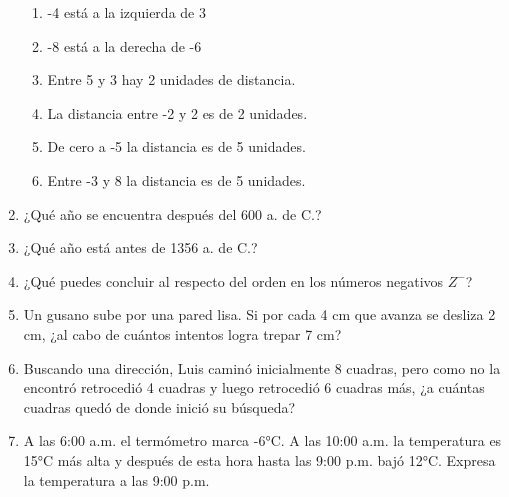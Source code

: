 \documentclass[fleqn]{article}
\begin{document}
\begin{enumerate}
\begin{enumerate}
  \item -4 está a la izquierda de 3 \noanswer
  \item -8 está a la derecha de -6 \noanswer
  \item Entre 5 y 3 hay 2 unidades de distancia.\noanswer
  \newpage
  \item La distancia entre -2 y 2 es de 2 unidades. \noanswer[.25in]
  \item De cero a -5 la distancia es de 5 unidades.\noanswer[.25in]
  \item Entre -3 y 8 la distancia es de 5 unidades.\noanswer[.25in]
\end{enumerate}
  \item ¿Qué año se encuentra después del 600 a. de C.? \dotfill
  \item ¿Qué año está antes de 1356 a. de C.?\dotfill
  \item ¿Qué puedes concluir al respecto del orden en los números negativos $Z^-$?\noanswer
\item Un gusano sube por una pared lisa. Si por cada 4 cm que avanza se desliza 2 cm, ¿al cabo de cuántos intentos logra trepar 7 cm? \noanswer
\item Buscando una dirección, Luis caminó inicialmente 8 cuadras, pero como no la encontró retrocedió 4 cuadras y luego retrocedió 6 cuadras más, ¿a cuántas cuadras quedó de donde inició su búsqueda?\noanswer
\item A las 6:00 a.m. el termómetro marca -6°C. A las 10:00 a.m. la temperatura es 15°C más alta y después de esta hora hasta las 9:00 p.m. bajó 12°C. Expresa la temperatura a las 9:00 p.m. \noanswer
\end{enumerate}
\end{document}
